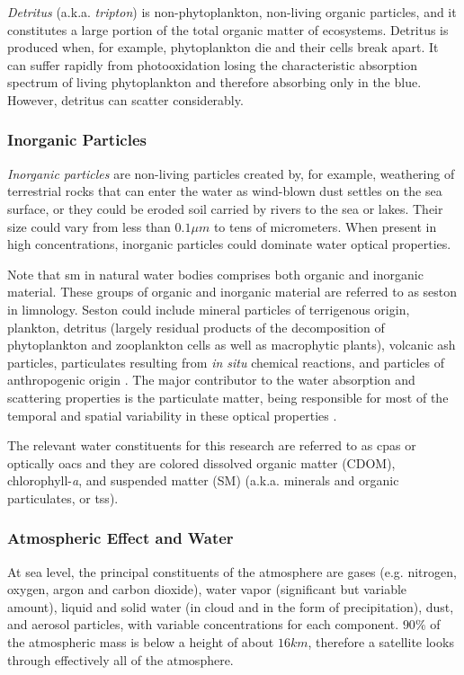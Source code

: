 {\it Detritus} (a.k.a. {\it tripton}) is non-phytoplankton, non-living organic particles, and it constitutes a large portion of the total organic matter of ecosystems. Detritus is produced when, for example, phytoplankton die and their cells break apart. It can suffer rapidly from photooxidation losing the characteristic absorption spectrum of living phytoplankton and therefore absorbing only in the blue. However, detritus can scatter considerably.  
\subsubsection*{Inorganic Particles}

{\it Inorganic particles} are non-living particles created by, for example, weathering of terrestrial rocks that can enter the water as wind-blown dust settles on the sea surface, or they could be eroded soil carried by rivers to the sea or lakes. Their size could vary from less than $0.1\mu m$ to tens of micrometers. When present in high concentrations, inorganic particles could dominate water optical properties.

Note that \acrfull{sm} in natural water bodies comprises both organic and inorganic material. These groups of organic and inorganic material are referred to as seston in limnology. Seston could include mineral particles of terrigenous origin, plankton, detritus (largely residual products of the decomposition of phytoplankton and zooplankton cells as well as macrophytic plants), volcanic ash particles, particulates resulting from {\it in situ} chemical reactions, and particles of anthropogenic origin \citep{Bukata1995}. The major contributor to the water absorption and scattering properties is the particulate matter, being responsible for most of the temporal and spatial variability in these optical properties \citep{Mobley:2001}.

The relevant water constituents for this research are referred to as \acrfull{cpas} or optically \gls{oacs} and they are colored dissolved organic matter (CDOM), chlorophyll-{\it a}, and suspended matter (SM) (a.k.a. minerals and organic particulates, or \gls{tss}).

\subsubsection{Atmospheric Effect and Water}
At sea level, the principal constituents of the atmosphere are gases (e.g. nitrogen, oxygen, argon and carbon dioxide), water vapor (significant but variable amount), liquid and solid water (in cloud and in the form of precipitation), dust, and aerosol particles, with variable concentrations for each component. $90\%$ of the atmospheric mass is below a height of about $16km$, therefore a satellite looks through effectively all of the atmosphere.

